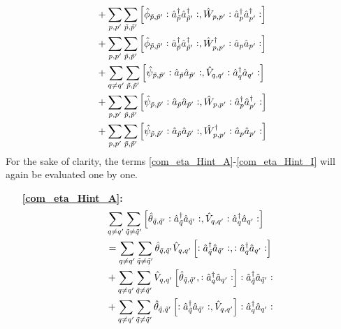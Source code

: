 \begin{appendix}
\begin{subequations}
\begin{align}
&+ \sum\limits_{p, p^\prime}\sum\limits_{\tilde p,\tilde p^\prime} \left[\hat\phi_{\tilde p,\tilde p^\prime}\vcentcolon\hat a^\dagger_{\tilde p}\hat a^\dagger_{\tilde p^\prime}\vcentcolon,\hat W_{p,p^\prime}\vcentcolon\hat a^\dagger_p\hat a^\dagger_{p^\prime}\vcentcolon\right]\label{com_eta_Hint_E}\\
&+ \sum\limits_{p, p^\prime}\sum\limits_{\tilde p,\tilde p^\prime} \left[\hat\phi_{\tilde p,\tilde p^\prime}\vcentcolon\hat a^\dagger_{\tilde p}\hat a^\dagger_{\tilde p^\prime}\vcentcolon,\hat W_{p,p^\prime}^\dagger\vcentcolon\hat a_p\hat a_{p^\prime}\vcentcolon\right]\label{com_eta_Hint_F}\\
&+ \sum\limits_{q\neq q^\prime}\sum\limits_{\tilde p,\tilde p^\prime} \left[\hat\psi_{\tilde p,\tilde p^\prime}\vcentcolon\hat a_{\tilde p}\hat a_{\tilde p^\prime}\vcentcolon,\hat V_{q,q^\prime}\vcentcolon\hat a^\dagger_q\hat a_{q^\prime}\vcentcolon\right] \label{com_eta_Hint_G} \\
&+ \sum\limits_{p, p^\prime}\sum\limits_{\tilde p,\tilde p^\prime} \left[\hat\psi_{\tilde p,\tilde p^\prime}\vcentcolon\hat a_{\tilde p}\hat a_{\tilde p^\prime}\vcentcolon,\hat W_{p,p^\prime}\vcentcolon\hat a^\dagger_p\hat a^\dagger_{p^\prime}\vcentcolon\right]\label{com_eta_Hint_H}\\
&+ \sum\limits_{p, p^\prime}\sum\limits_{\tilde p,\tilde p^\prime} \left[\hat\psi_{\tilde p,\tilde p^\prime}\vcentcolon\hat a_{\tilde p}\hat a_{\tilde p^\prime}\vcentcolon,\hat W_{p,p^\prime}^\dagger\vcentcolon\hat a_p\hat a_{p^\prime}\vcentcolon\right]\label{com_eta_Hint_I}
\end{align}
\end{subequations}
For the sake of clarity, the terms \ref{com_eta_Hint_A}-\ref{com_eta_Hint_I} will again be evaluated one by one.
\begin{itemize}
\item[\textbf{\ref{com_eta_Hint_A}:}]
\begin{align}
&\Sum_{q\neq q^\prime}\Sum_{\tilde q\neq\tilde q^\prime} \left[\hat\theta_{\tilde q,\tilde q^\prime}\NO\CR_{\tilde q}\AN_{\tilde q^\prime}\NO,\hat V_{q,q^\prime}\NO\CR_q\AN_{q^\prime}\NO\right]\nonumber \\
&=\Sum_{q\neq q^\prime}\Sum_{\tilde q\neq\tilde q^\prime} \hat\theta_{\tilde q,\tilde q^\prime}\hat V_{q,q^\prime}\left[\NO\CR_{\tilde q}\AN_{\tilde q^\prime}\NO,\NO\CR_q\AN_{q^\prime}\NO\right] \nonumber \\
&+\Sum_{q\neq q^\prime}\Sum_{\tilde q\neq\tilde q^\prime} \hat V_{q,q^\prime}\left[\hat\theta_{\tilde q,\tilde q^\prime},\NO\CR_q\AN_{q^\prime}\NO\right]\NO\CR_{\tilde q}\AN_{\tilde q^\prime}\NO\nonumber \\
&+\Sum_{q\neq q^\prime}\Sum_{\tilde q\neq\tilde q^\prime} \hat\theta_{\tilde q,\tilde q^\prime}\left[\NO\CR_{\tilde q}\AN_{\tilde q^\prime}\NO,\hat V_{q,q^\prime}\right]\NO\CR_q\AN_{q^\prime}\NO\nonumber \\

\end{align}
\end{itemize}
\end{appendix}
